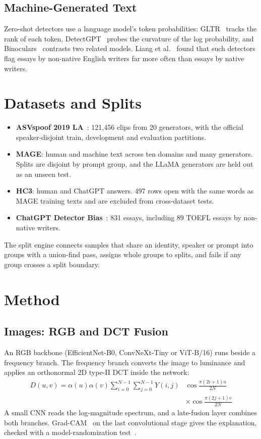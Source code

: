 \documentclass[conference]{IEEEtran}
\begin{document}
\subsection{Machine-Generated Text}
Zero-shot detectors use a language model's token probabilities: GLTR~\cite{gehrmann2019gltr} tracks the rank of each token, DetectGPT~\cite{mitchell2023detectgpt} probes the curvature of the log probability, and Binoculars~\cite{hans2024binoculars} contrasts two related models. Liang et al.~\cite{liang2023gpt} found that such detectors flag essays by non-native English writers far more often than essays by native writers.

\section{Datasets and Splits}

\begin{itemize}
    \item \textbf{ASVspoof 2019 LA}~\cite{todisco2019asvspoof}: 121,456 clips from 20 generators, with the official speaker-disjoint train, development and evaluation partitions.
    \item \textbf{MAGE}: human and machine text across ten domains and many generators. Splits are disjoint by prompt group, and the LLaMA generators are held out as an unseen test.
    \item \textbf{HC3}: human and ChatGPT answers. 497 rows open with the same words as MAGE training texts and are excluded from cross-dataset tests.
    \item \textbf{ChatGPT Detector Bias}~\cite{liang2023gpt}: 831 essays, including 89 TOEFL essays by non-native writers.
\end{itemize}

The split engine connects samples that share an identity, speaker or prompt into groups with a union-find pass, assigns whole groups to splits, and fails if any group crosses a split boundary.

\section{Method}

\subsection{Images: RGB and DCT Fusion}
An RGB backbone (EfficientNet-B0, ConvNeXt-Tiny or ViT-B/16) runs beside a frequency branch. The frequency branch converts the image to luminance and applies an orthonormal 2D type-II DCT inside the network:
\begin{equation}
\begin{split}
    D(u, v) = \alpha(u)\alpha(v) \sum_{i=0}^{N-1}\sum_{j=0}^{N-1} Y(i, j) &\cos\frac{\pi(2i+1)u}{2N} \\
    &\times \cos\frac{\pi(2j+1)v}{2N}
\end{split}
\end{equation}
A small CNN reads the log-magnitude spectrum, and a late-fusion layer combines both branches. Grad-CAM~\cite{selvaraju2017gradcam} on the last convolutional stage gives the explanation, checked with a model-randomization test~\cite{adebayo2018sanity}.
\end{document}
